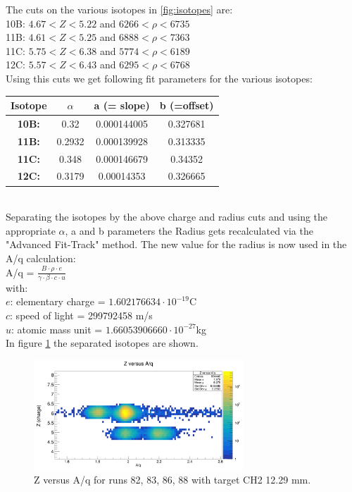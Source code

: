 \documentclass[12pt, letterpaper]{article}
\begin{document}
The cuts on the various isotopes in \ref{fig:isotopes} are:\\
10B: $4.67 < Z < 5.22$ and $6266 < \rho < 6735$\\
11B: $4.61 < Z < 5.25$ and $6888 < \rho < 7363$\\
11C: $5.75 < Z < 6.38$ and $5774 < \rho < 6189$\\
12C: $5.57 < Z < 6.43$ and $6295 < \rho < 6768$\\
\newline
Using this cuts we get following fit parameters for the various isotopes:\\
\newline
\begin{tabular}{|c|c|c|c|}
\hline
Isotope & $\alpha$ & a (= slope) & b (=offset) \\
\hline
\textbf{10B:} & 0.32 & 0.000144005 & 0.327681\\
\hline
\textbf{11B:} & 0.2932 & 0.000139928 & 0.313335\\
\hline
\textbf{11C:} & 0.348 & 0.000146679 & 0.34352\\
\hline
\textbf{12C:} & 0.3179 & 0.00014353 & 0.326665\\
\hline
\end{tabular}
\\
\newline
Separating the isotopes by the above charge and radius cuts and using the appropriate $\alpha$, a and b parameters the Radius gets recalculated via the "Advanced Fit-Track" method. The new value for the radius is now used in the A/q calculation:\\
A/q = $\frac{B \cdot \rho \cdot e}{\gamma\cdot\beta \cdot c \cdot u}$ \\
with:\\
$e$: elementary charge = $1.602176634\cdot10^{-19}$C\\
$c$: speed of light = 299792458 m/s\\
$u$: atomic mass unit = $1.66053906660\cdot10^{-27}$kg\\
In figure \ref{fig:z_vs_aq} the separated isotopes are shown.
\begin{figure}[!htb]
	\centering
	\includegraphics[width=0.7\textwidth]{z_vs_aq_combined.png}
	\caption{Z versus A/q for runs 82, 83, 86, 88 with target CH2 12.29 mm.}
	\label{fig:z_vs_aq}
\end{figure}
\end{document}
